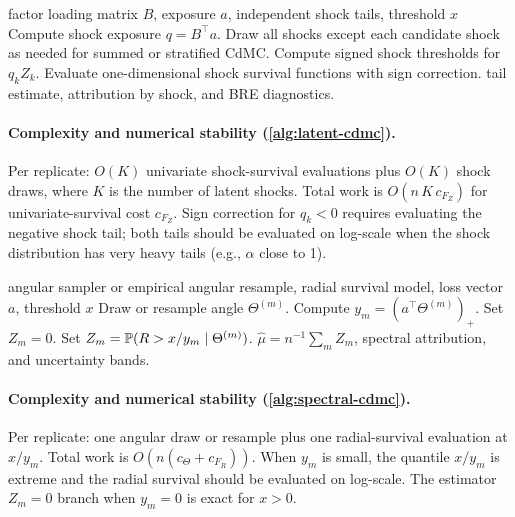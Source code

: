 \begin{algorithm}[H]
\caption{Latent-shock CdMC}
\label{alg:latent-cdmc}
\begin{algorithmic}[1]
\Require factor loading matrix \(B\), exposure \(a\), independent shock tails, threshold \(x\)
\State Compute shock exposure \(q=B^\top a\).
  \State Draw all shocks except each candidate shock as needed for summed or stratified CdMC.
  \State Compute signed shock thresholds for \(q_kZ_k\).
  \State Evaluate one-dimensional shock survival functions with sign correction.
\EndFor
\State \Return tail estimate, attribution by shock, and BRE diagnostics.
\end{algorithmic}
\end{algorithm}

\paragraph{Complexity and numerical stability (\cref{alg:latent-cdmc}).}
Per replicate: $O(K)$ univariate shock-survival evaluations plus $O(K)$ shock
draws, where $K$ is the number of latent shocks. Total work is
$O(n\,K\,c_{F_Z})$ for univariate-survival cost $c_{F_Z}$. Sign correction for
$q_k<0$ requires evaluating the negative shock tail; both tails should be
evaluated on log-scale when the shock distribution has very heavy tails
(e.g., $\alpha$ close to 1).

\begin{algorithm}[H]
\caption{Spectral/radial CdMC}
\label{alg:spectral-cdmc}
\begin{algorithmic}[1]
\Require angular sampler or empirical angular resample, radial survival model, loss vector \(a\), threshold \(x\)
  \State Draw or resample angle \(\Theta^{(m)}\).
  \State Compute \(y_m=(a^\top\Theta^{(m)})_+\).
    \State Set \(Z_m=0\).
  \Else
    \State Set \(Z_m=\mathbb{P}(R>x/y_m\mid \Theta^{(m)})\).
  \EndIf
\EndFor
\State \Return \(\widehat\mu=n^{-1}\sum_mZ_m\), spectral attribution, and uncertainty bands.
\end{algorithmic}
\end{algorithm}

\paragraph{Complexity and numerical stability (\cref{alg:spectral-cdmc}).}
Per replicate: one angular draw or resample plus one radial-survival evaluation
at $x/y_m$. Total work is $O(n(c_\Theta+c_{F_R}))$. When $y_m$ is small, the
quantile $x/y_m$ is extreme and the radial survival should be evaluated on
log-scale. The estimator $Z_m=0$ branch when $y_m=0$ is exact for $x>0$.

